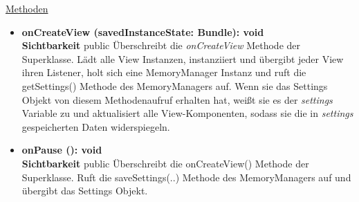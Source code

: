\underline{Methoden}
\begin{itemize}
\itemsep0pt
\item \textbf{onCreateView (savedInstanceState: Bundle): void}\hfill\\
\textbf{Sichtbarkeit} public\newline
Überschreibt die \textit{onCreateView} Methode der Superklasse. Lädt alle View Instanzen, instanziiert und übergibt jeder View ihren Listener, holt sich eine MemoryManager Instanz und ruft die getSettings() Methode des MemoryManagers auf. Wenn sie das Settings Objekt von diesem Methodenaufruf erhalten hat, weißt sie es der \textit{settings} Variable zu und aktualisiert alle View-Komponenten, sodass sie die in \textit{settings} gespeicherten Daten widerspiegeln.

\item \textbf{onPause (): void}\hfill\\
\textbf{Sichtbarkeit} public\newline
Überschreibt die onCreateView() Methode der Superklasse. Ruft die saveSettings(..) Methode des MemoryManagers auf und übergibt das Settings Objekt.

\end{itemize}